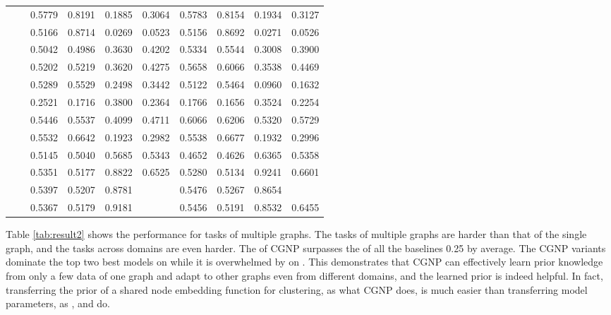 \begin{table}[t]
{\begin{tabular}{|l|l|r|r|r|r|r|r|r|r|}
			\multirow{11}{*}{\rotatebox{90}{\Citeseercora}} 
			&\ATC       & 0.5779 & 0.8191 & 0.1885 & 0.3064 & 0.5783 & 0.8154 & 0.1934 & 0.3127 \\
			&\CTC       & 0.5166 & 0.8714 & 0.0269 & 0.0523 & 0.5156 & 0.8692 & 0.0271 & 0.0526 \\\cline{2-10}
			&\MAML      & 0.5042 & 0.4986 & 0.3630 & 0.4202 & 0.5334 & 0.5544 & 0.3008 & 0.3900 \\
			&\Reptile   & 0.5202 & 0.5219 & 0.3620 & 0.4275 & 0.5658 & 0.6066 & 0.3538 & 0.4469 \\
			&\Featrans  & 0.5289 & 0.5529 & 0.2498 & 0.3442 & 0.5122 & 0.5464 & 0.0960 & 0.1632 \\
			&\PN        & 0.2521 & 0.1716 & 0.3800 & 0.2364 & 0.1766 & 0.1656 & 0.3524 & 0.2254 \\\cline{2-10}
			&\Supervise & 0.5446 & 0.5537 & 0.4099 & 0.4711 & 0.6066 & 0.6206 & 0.5320 & 0.5729 \\
			&\ICSGNN    & 0.5532 & 0.6642 & 0.1923 & 0.2982 & 0.5538 & 0.6677 & 0.1932 & 0.2996 \\
			&\AQDGNN    & 0.5145 & 0.5040 & 0.5685 & 0.5343 & 0.4652 & 0.4626 & 0.6365 & 0.5358\\\cline{2-10}
			&\CGNPIP    & 0.5351 & 0.5177 & 0.8822 & 0.6525 & 0.5280 & 0.5134 & 0.9241 & \cellcolor{LightRed}0.6601 \\
			&\CGNPMLP   & 0.5397 & 0.5207 & 0.8781 & \cellcolor{LightCyan}{0.6537} & 0.5476 & 0.5267 & 0.8654 & \cellcolor{LightCyan}{0.6548} \\
			&\CGNPGNN   & 0.5367 & 0.5179 & 0.9181 & \cellcolor{LightRed}{0.6623} &  0.5456 & 0.5191 & 0.8532 & 0.6455\\\hline
		\end{tabular}
	}
\end{table}
 


Table \ref{tab:result2} shows the performance for tasks of multiple graphs.
The tasks of multiple graphs are harder than that of the single graph, and the tasks across domains are even harder. 
The \Fone of CGNP surpasses the \Fone of all the baselines 0.25 by average. 
The CGNP variants dominate the top two best models on \Citeseercora while it is overwhelmed by \ICSGNN on \Facebook.
This demonstrates that CGNP can effectively learn prior knowledge from only a few data of one graph and adapt to other graphs even from different domains, and the learned prior is indeed helpful.
In fact, transferring the prior of a shared node embedding function for clustering, as what CGNP does, is much easier than transferring model parameters, as \MAML, {\Reptile} and \Featrans do. 
%


